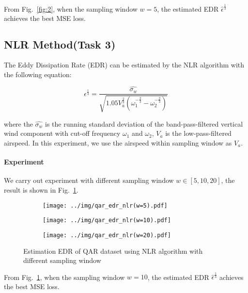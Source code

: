 \documentclass[runningheads]{llncs}
\begin{document}
From Fig.~\ref{fig:2}, when the sampling window $w=5$, the estimated EDR $\hat{\epsilon}^{\frac13}$ achieves the best MSE loss.

\subsection{NLR Method(Task 3)}

The Eddy Dissipation Rate (EDR) can be estimated by the NLR algorithm with the following equation:

\begin{equation}
    \epsilon^{\frac13}=\frac{\widehat{\sigma_w}}{\sqrt{1.05V_a^{\frac23}\left(\omega_1^{-\frac23}-\omega_2^{-\frac23}\right)}}
\end{equation}

where the $\widehat{\sigma_w}$ is the running standard deviation of the band-pass-filtered vertical wind component with cut-off frequency $\omega_1$ and $\omega_2$, 
$V_a$ is the low-pass-filtered airspeed. In this experiment, we use the airspeed within sampling window as $V_a$.

\paragraph{Experiment}

We carry out experiment with different sampling window $w \in [5,10,20]$, the result is shown in Fig.~\ref{fig:3}.

\begin{figure}
    \centering
    \begin{subfigure}{.4\textwidth}
        \centering
        \texttt{[image: ../img/qar\_edr\_nlr(w=5).pdf]}
    \end{subfigure}
    \begin{subfigure}{.4\textwidth}
        \centering
        \texttt{[image: ../img/qar\_edr\_nlr(w=10).pdf]}
    \end{subfigure}
    \begin{subfigure}{.4\textwidth}
        \centering
        \texttt{[image: ../img/qar\_edr\_nlr(w=20).pdf]}
    \end{subfigure}
    \caption{Estimation EDR of QAR dataset using NLR algorithm with different sampling window}
    \label{fig:3}
\end{figure}

From Fig.~\ref{fig:3}, when the sampling window $w=10$, the estimated EDR $\hat{\epsilon}^{\frac13}$ achieves the best MSE loss.
\end{document}
